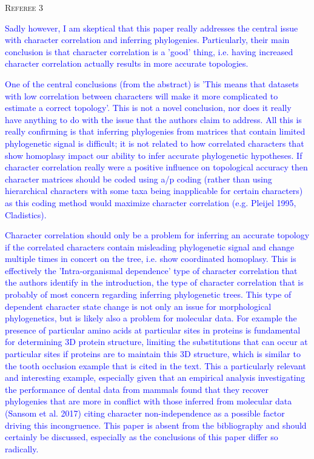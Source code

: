 \documentclass[12pt,letterpaper]{article}
\renewcommand{\section}[1]{%
\bigskip
\begin{center}
\begin{Large}
\normalfont\scshape #1
\medskip
\end{Large}
\end{center}}
\begin{document}
\section{Referee 3}

\textcolor{blue}{Sadly however, I am skeptical that this paper really addresses the central issue with character correlation and inferring phylogenies. Particularly, their main conclusion is that character correlation is a 'good' thing, i.e. having increased character correlation actually results in more accurate topologies.} 

\textcolor{blue}{One of the central conclusions (from the abstract) is 'This means that datasets with low correlation between characters will make it more complicated to estimate a correct topology'. This is not a novel conclusion, nor does it really have anything to do with the issue that the authors claim to address. All this is really confirming is that inferring phylogenies from matrices that contain limited phylogenetic signal is difficult; it is not related to how correlated characters that show homoplasy impact our ability to infer accurate phylogenetic hypotheses. If character correlation really were a positive influence on topological accuracy then character matrices should be coded using a/p coding (rather than using hierarchical characters with some taxa being inapplicable for certain characters) as this coding method would maximize character correlation (e.g. Pleijel 1995, Cladistics).}

\textcolor{blue}{Character correlation should only be a problem for inferring an accurate topology if the correlated characters contain misleading phylogenetic signal and change multiple times in concert on the tree, i.e. show coordinated homoplasy.  This is effectively the 'Intra-organismal dependence' type of character correlation that the authors identify in the introduction, the type of character correlation that is probably of most concern regarding inferring phylogenetic trees. This type of dependent character state change is not only an issue for morphological phylogenetics, but is likely also a problem for molecular data. For example the presence of particular amino acids at particular sites in proteins is fundamental for determining 3D protein structure, limiting the substitutions that can occur at particular sites if proteins are to maintain this 3D structure, which is similar to the tooth occlusion example that is cited in the text. This a particularly relevant and interesting example, especially given that an empirical analysis investigating the performance of dental data from mammals found that they recover phylogenies that are more in conflict with those inferred from molecular data (Sansom et al. 2017) citing character non-independence as a possible factor driving this incongruence. This paper is absent from the bibliography and should certainly be discussed, especially as the conclusions of this paper differ so radically.}
\end{document}
